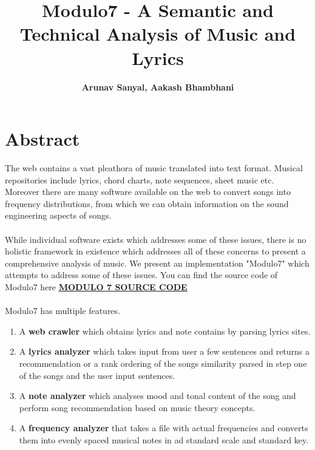 \documentclass[letterpaper, 11pt]{article}
\begin{document}
\title{Modulo7 - A Semantic and Technical Analysis of Music and Lyrics
\\} 
\author{\textbf{Arunav Sanyal, Aakash Bhambhani}}
\maketitle

\section*{Abstract}
The web contains a vast pleathora of music translated into text format. Musical repositories include lyrics, chord charts, note sequences, sheet music etc. Moreover there are many software available on the web to convert songs into frequency distributions, from which we can obtain information on the sound engineering aspects of songs.\\\\
While individual software exists which addresses some of these issues, there is no holistic framework in existence which addresses all of these concerns to present a comprehensive analysis of music. We present an implementation "Modulo7" which attempts to address some of these issues. You can find the source code of Modulo7 here \href{https://github.com/Khalian/Modulo7}{\textbf{MODULO 7 SOURCE CODE}}
 \\\\
Modulo7 has multiple features. 
\begin{enumerate}
\item A \textbf{web crawler} which obtains lyrics and note contains by parsing lyrics sites.
\item A \textbf{lyrics analyzer} which takes input from user a few sentences and returns a recommendation or a rank ordering of the songs similarity parsed in step one of the songs and the user input sentences.
\item A \textbf{note analyzer} which analyses mood and tonal content of the song and perform song recommendation based on music theory concepts.
\item A \textbf{frequency analyzer} that takes a file with actual frequencies and converts them into evenly spaced musical notes in ad standard scale and standard key.
\end{enumerate} 
\end{document}
